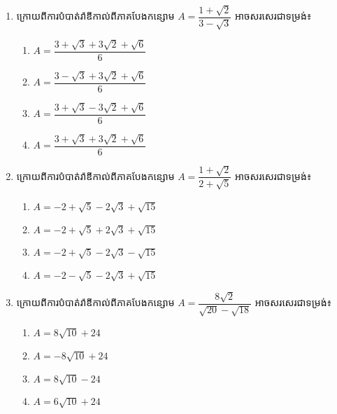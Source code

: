 \begin{enumerate}
\item ក្រោយពីការបំបាត់រ៉ាឌីកាល់ពីភាគបែងកន្សោម $A=\dfrac{1+\sqrt{2}}{3-\sqrt{3}}$ អាចសរសេរជាទម្រង់៖
\begin{multicols}{2}
\begin{enumerate}[label=\alph*.]
	\item $A=\dfrac{3+\sqrt{3}+3\sqrt{2}+\sqrt{6}}{6}$
	\item  $A=\dfrac{3-\sqrt{3}+3\sqrt{2}+\sqrt{6}}{6}$
	\item $A=\dfrac{3+\sqrt{3}-3\sqrt{2}+\sqrt{6}}{6}$
	\item  $A=\dfrac{3+\sqrt{3}+3\sqrt{2}+\sqrt{6}}{6}$
\end{enumerate}
\end{multicols}

\item ក្រោយពីការបំបាត់រ៉ាឌីកាល់ពីភាគបែងកន្សោម $A=\dfrac{1+\sqrt{2}}{2+\sqrt{5}}$ អាចសរសេរជាទម្រង់៖
\begin{multicols}{2}
\begin{enumerate}[label=\alph*.]
	\item $A={-2+\sqrt{5}-2\sqrt{3}+\sqrt{15}}$
	\item $A={-2+\sqrt{5}+2\sqrt{3}+\sqrt{15}}$
	\item $A={-2+\sqrt{5}-2\sqrt{3}-\sqrt{15}}$
	\item $A={-2-\sqrt{5}-2\sqrt{3}+\sqrt{15}}$
\end{enumerate}
\end{multicols}

\item ក្រោយពីការបំបាត់រ៉ាឌីកាល់ពីភាគបែងកន្សោម $A=\dfrac{8\sqrt{2}}{\sqrt{20}-\sqrt{18}}$ អាចសរសេរជាទម្រង់៖
\begin{multicols}{2}
\begin{enumerate}[label=\alph*.]
	\item $A=8\sqrt{10}+24$
	\item $A=-8\sqrt{10}+24$
	\item $A=8\sqrt{10}-24$
	\item $A=6\sqrt{10}+24$
\end{enumerate}
\end{multicols}
\end{enumerate}
\newpage

